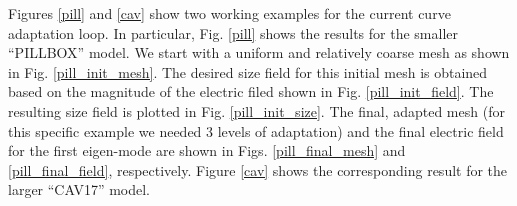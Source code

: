 \documentclass[review,12pt]{elsarticle_summary_report}
\begin{document}

Figures \ref{pill} and \ref{cav} show two working examples for the current curve adaptation loop.
In particular, Fig. \ref{pill} shows the results for the smaller ``PILLBOX'' model. We start with a uniform and relatively coarse mesh as shown in Fig. \ref{pill_init_mesh}. The desired size field for this initial mesh is obtained based on the magnitude of the electric filed shown in Fig. \ref{pill_init_field}. The resulting size field is plotted in Fig. \ref{pill_init_size}. The final, adapted mesh (for this specific example we needed 3 levels of adaptation) and the final electric field for the first eigen-mode are shown in Figs. \ref{pill_final_mesh} and \ref{pill_final_field}, respectively. Figure \ref{cav} shows the corresponding result for the larger ``CAV17'' model.
\end{document}
